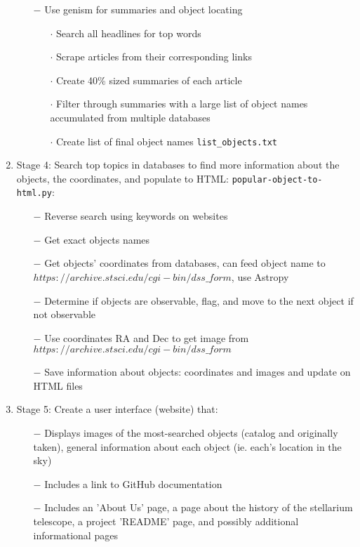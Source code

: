 \documentclass[12pt,letterpaper]{article}
\begin{document}
\begin{enumerate}[leftmargin=*]
\begin{enumerate}
            \item [$-$] Use genism for summaries and object locating
            \begin{enumerate}[leftmargin=*]
                \item[$\cdot$] Search all headlines for top words
                \item[$\cdot$] Scrape articles from their corresponding links
                \item[$\cdot$] Create 40\% sized summaries of each article 
                \item[$\cdot$] Filter through summaries with a large 
                  list of object names accumulated from multiple databases
                 \item[$\cdot$] Create list of final object names \texttt{list\_objects.txt}
            \end{enumerate}
        \end{enumerate}
    \item Stage 4: Search top topics in databases to find more information 
    about the objects, the coordinates, and populate to HTML: \texttt{popular-object-to-html.py}:
        \begin{enumerate}
            \item [$-$] Reverse search using keywords on websites
            \item [$-$] Get exact objects names
            \item [$-$] Get objects' coordinates from databases, can feed object 
              name to $https://archive.stsci.edu/cgi-bin/dss\_form$, use Astropy
            \item [$-$] Determine if objects are observable, flag, and move to the next object if not observable
            \item [$-$] Use coordinates RA and Dec to get image 
              from $https://archive.stsci.edu/cgi-bin/dss\_form$
            \item [$-$] Save information about objects: coordinates and images and update on HTML files
        \end{enumerate}
    \item Stage 5: Create a user interface (website) that:
    \begin{enumerate}
        \item [$-$] Displays images of the most-searched objects (catalog and originally taken),
        general information about each object (ie. each's location in the sky)
        \item [$-$] Includes a link to GitHub documentation
        \item [$-$] Includes an 'About Us' page, a page about the history of the stellarium telescope, 
          a project 'README' page, and possibly additional informational pages
    \end{enumerate}
\end{enumerate}
\end{document}
